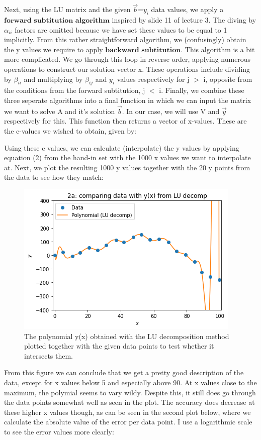 Next, using the LU matrix and the given $\vec{b}$=$y_i$ data values, we apply a $\textbf{forward subtitution algorithm}$ inspired by slide 11 of lecture 3. The diving by $\alpha_{ii}$ factors are omitted because we have set these values to be equal to 1 implicitly. From this rather straightforward algorithm, we (confusingly) obtain the y values we require to apply $\textbf{backward subtitution}$. This algorithm is a bit more complicated. We go through this loop in reverse order, applying numerous operations to construct our solution vector x. These operations include dividing by $\beta_{ii}$ and multiplying by $\beta_{ij}$ and $y_i$ values respectively for j $>$ i, opposite from the conditions from the forward subtitution, j $<$ i. Finally, we combine these three seperate algorithms into a final function in which we can input the matrix we want to solve A and it's solution $\vec{b}$. In our case, we will use V and $\vec{y}$ respectively for this. This function then returns a vector of x-values. These are the c-values we wished to obtain, given by:



Using these c values, we can calculate (interpolate) the y values by applying equation (2) from the hand-in set with the 1000 x values we want to interpolate at. Next, we plot the resulting 1000 y values together with the 20 y points from the data to see how they match:

\begin{figure}[h!]
  \centering
  \includegraphics[width=0.6\linewidth]{problem2a1.png}
  \caption{The polynomial y(x) obtained with the LU decomposition method plotted together with the given data points to test whether it intersects them.}
  \label{fig:fig1}
\end{figure}

From this figure we can conclude that we get a pretty good description of the data, except for x values below 5 and especially above 90. At x values close to the maximum, the polymial seems to vary wildy. Despite this, it still does go through the data points somewhat well as seen in the plot. The accuracy does decrease at these higher x values though, as can be seen in the second plot below, where we calculate the absolute value of the error per data point. I use a logarithmic scale to see the error values more clearly:

